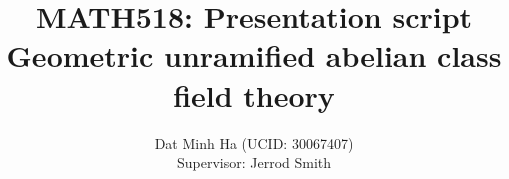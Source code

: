 
\usepackage{soul}





	\title{\textbf{MATH518: Presentation script
	\\
	Geometric unramified abelian class field theory}}
	
	\author{Dat Minh Ha (UCID: 30067407)\\Supervisor: Jerrod Smith}
	\maketitle
	
	
    	    
	\printbibliography

